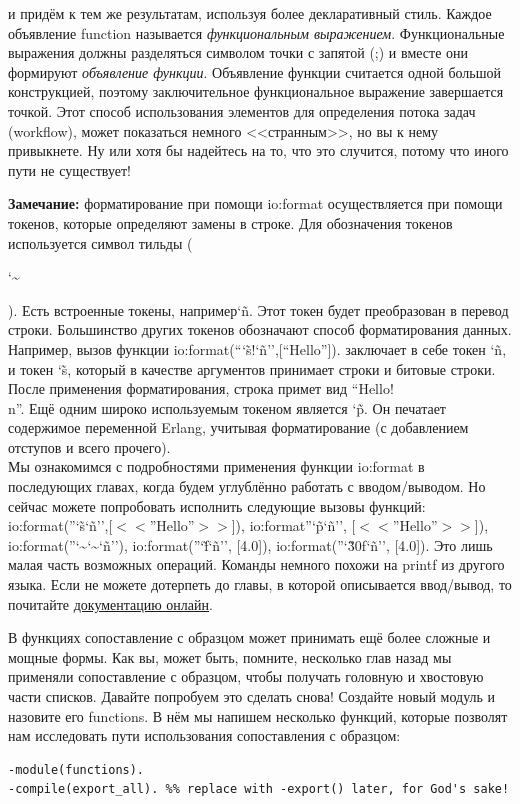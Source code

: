 \documentclass[a4paper,12pt]{report}
\newcommand\mytilde{\char`\~}
\newcommand{\ops}{\colorbox{lgreen}}
\begin{document}
и придём к тем же результатам, используя более декларативный стиль. Каждое объявление \ops{function} называется \emph{функциональным выражением}. Функциональные выражения должны разделяться символом точки с запятой (\ops{;}) и вместе они формируют \emph{объявление функции}. Объявление функции считается одной большой конструкцией, поэтому заключительное функциональное выражение завершается точкой. Этот способ использования элементов для определения потока задач (workflow), может показаться немного <<странным>>, но вы к нему привыкнете. Ну или хотя бы надейтесь на то, что это случится, потому что иного пути не существует!\\
\colorbox{lgray}
{
    \begin{minipage}{1\linewidth}
        \textbf{Замечание:} форматирование при помощи \ops{io:format} осуществляется при помощи токенов, которые определяют замены в строке. Для обозначения токенов используется символ тильды (\ops{\strut\mytilde}). Есть встроенные токены, например\ops{\mytilde n}. Этот токен будет преобразован в перевод строки. Большинство других токенов обозначают способ форматирования данных. Например, вызов функции \ops{io:format(``\mytilde s!\mytilde n'',[``Hello'']).} заключает в себе токен \ops{\mytilde n}, и токен \ops{\mytilde s}, который в качестве аргументов принимает строки и битовые строки. После применения форматирования, строка примет вид \ops{``Hello!\\n''}. Ещё одним широко используемым токеном является \ops{\mytilde p}. Он печатает содержимое переменной Erlang, учитывая форматирование (с добавлением отступов и всего прочего).\\ 
        Мы ознакомимся с подробностями применения функции \ops{io:format} в последующих главах, когда будем углублённо работать с вводом/выводом. Но сейчас можете попробовать исполнить следующие вызовы функций: \ops{io:format(''\mytilde s\mytilde n'',[$<<$''Hello''$>>$])}, \ops{io:format''\mytilde p\mytilde n'', [$<<$''Hello''$>>$])}, \ops{io:format(''\mytilde\mytilde\mytilde n'')}, \ops{io:format(''\mytilde f\mytilde n'', [4.0])}, \ops{io:format(''\mytilde 30f\mytilde n'', [4.0])}. Это лишь малая часть возможных операций. Команды немного похожи на \ops{printf} из другого языка. Если не можете дотерпеть до главы, в которой описывается ввод/вывод, то почитайте \href{http://erlang.org/doc/man/io.html\#format-3}{документацию онлайн}.
    \end{minipage}
}

В функциях сопоставление с образцом может принимать ещё более сложные и мощные формы. Как вы, может быть, помните, несколько глав назад мы применяли сопоставление с образцом, чтобы получать головную и хвостовую части списков. Давайте попробуем это сделать снова! Создайте новый модуль и назовите его \ops{functions}. В нём мы напишем несколько функций, которые позволят нам исследовать пути использования сопоставления с образцом:
\begin{lstlisting}[style=erlang]
-module(functions).
-compile(export_all). %% replace with -export() later, for God's sake!
\end{lstlisting}
\end{document}
